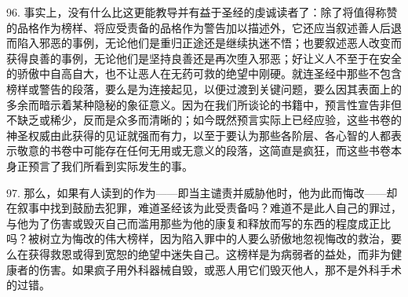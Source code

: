 96. 事实上，没有什么比这更能教导并有益于圣经的虔诚读者了：除了将值得称赞的品格作为榜样、将应受责备的品格作为警告加以描述外，它还应当叙述善人后退而陷入邪恶的事例，无论他们是重归正途还是继续执迷不悟；也要叙述恶人改变而获得良善的事例，无论他们是坚持良善还是再次堕入邪恶；好让义人不至于在安全的骄傲中自高自大，也不让恶人在无药可救的绝望中刚硬。就连圣经中那些不包含榜样或警告的段落，要么是为连接起见，以便过渡到关键问题，要么因其表面上的多余而暗示着某种隐秘的象征意义。因为在我们所谈论的书籍中，预言性宣告非但不缺乏或稀少，反而是众多而清晰的；如今既然预言实际上已经应验，这些书卷的神圣权威由此获得的见证就强而有力，以至于要认为那些各阶层、各心智的人都表示敬意的书卷中可能存在任何无用或无意义的段落，这简直是疯狂，而这些书卷本身正预言了我们所看到实际发生的事。\par

97. 那么，如果有人读到的作为——即当主谴责并威胁他时，他为此而悔改——却在叙事中找到鼓励去犯罪，难道圣经该为此受责备吗？难道不是此人自己的罪过，与他为了伤害或毁灭自己而滥用那些为他的康复和释放而写的东西的程度成正比吗？被树立为悔改的伟大榜样，因为陷入罪中的人要么骄傲地忽视悔改的救治，要么在获得救恩或得到宽恕的绝望中迷失自己。这榜样是为病弱者的益处，而非为健康者的伤害。如果疯子用外科器械自毁，或恶人用它们毁灭他人，那不是外科手术的过错。\par

